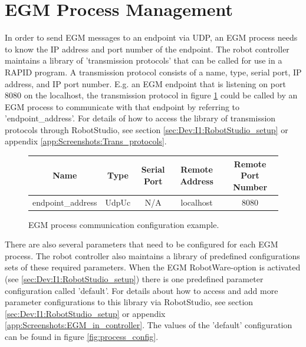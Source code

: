 \documentclass{cslthse-msc}
\begin{document}
\section{EGM Process Management}
\label{sec:EGM:Process_Management}
In order to send EGM messages to an endpoint via UDP, an EGM process needs to know the IP address and port number of the endpoint. The robot controller maintains a library of 'transmission protocols' that can be called for use in a RAPID program. A transmission protocol consists of a name, type, serial port, IP address, and IP port number. E.g. an EGM endpoint that is listening on port 8080 on the localhost, the transmission protocol in figure \ref{fig:process_comm} could be called by an EGM process to communicate with that endpoint by referring to 'endpoint\_address'. For details of how to access the library of transmission protocols through RobotStudio, see section \ref{sec:Dev:I1:RobotStudio_setup} or appendix \ref{app:Screenshots:Trans_protocols}. 
\begin{figure}[H]
    \centering
    \vspace{0.5cm}
    \begin{tabular}{|c|c|c|c|c|}
    \hline
\textbf{Name} & \textbf{Type} & \textbf{Serial Port} & \textbf{Remote Address} & \textbf{Remote Port Number}\\ \hline
endpoint\_address & UdpUc & N/A & localhost & 8080 \\ \hline
    \end{tabular}
    \caption{EGM process communication configuration example.}
    \label{fig:process_comm}
\end{figure}
\vspace{0.5cm}
There are also several parameters that need to be configured for each EGM process. The robot controller also maintains a library of predefined configurations sets of these required parameters. When the EGM RobotWare-option is activated (see \ref{sec:Dev:I1:RobotStudio_setup}) there is one predefined parameter configuration called 'default'. For details about how to access and add more parameter configurations to this library via RobotStudio, see section \ref{sec:Dev:I1:RobotStudio_setup} or appendix \ref{app:Screenshots:EGM_in_controller}. The values of the 'default' configuration can be found in figure \ref{fig:process_config}. 
\end{document}
